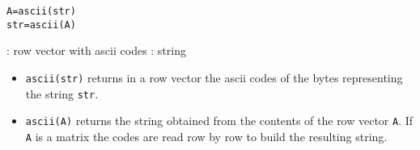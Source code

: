 
\begin{mandesc}
\end{mandesc}

\begin{calling_sequence}
\begin{verbatim}
A=ascii(str)  
str=ascii(A)  
\end{verbatim}
\end{calling_sequence}

\begin{parameters}
  \begin{varlist}
    : row vector with ascii codes
    : string
  \end{varlist}
\end{parameters}
\begin{mandescription}
\begin{itemize}
\item \verb+ascii(str)+ returns in a row vector the ascii codes 
  of the bytes representing the string \verb+str+. 
\item \verb+ascii(A)+ returns the string obtained from the contents 
  of the row vector \verb+A+. If \verb+A+ is a matrix the codes are read
  row by row to build the resulting string.
\end{itemize}

\end{mandescription}
